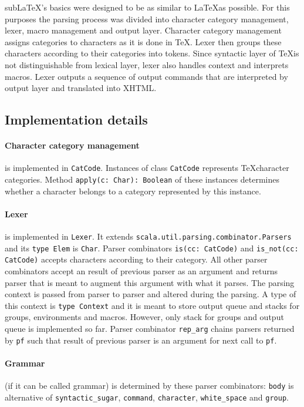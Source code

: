 \documentclass{article}
\begin{document}
sub\LaTeX's basics were designed to be as similar to \LaTeX as possible.
For this purposes the parsing process was divided into character category management,
lexer, macro management and output layer.
Character category management assigns categories to characters as it is done in \TeX.
Lexer then groups these characters according to their categories into tokens.
Since syntactic layer of \TeX is not distinguishable from lexical layer,
lexer also handles context and interprets macros. Lexer outputs a sequence of output commands
that are interpreted by output layer and translated into XHTML.


\subsection{Implementation details}

\paragraph{Character category management} is implemented in \verb+CatCode+.
Instances of class \verb+CatCode+ represents \TeX character categories.
Method \verb+apply(c: Char): Boolean+ of these instances determines
whether a character belongs to a category represented by this instance.

\paragraph{Lexer} is implemented in \verb+Lexer+. It extends \verb+scala.util.parsing.combinator.Parsers+
and its \verb+type Elem+ is \verb+Char+.
Parser combinators \verb+is(cc: CatCode)+ and%
\verb+is_not(cc: CatCode)+ accepts characters according to their category.
All other parser combinators accept an result of previous parser as an argument
and returns parser that is meant to augment this argument with what it parses.
The parsing context is passed from parser to parser and altered during the parsing.
A type of this context is \verb+type Context+ and it is meant to store output queue and stacks for groups,
environments and macros. However, only stack for groups and output queue is implemented so far.
Parser combinator \verb+rep_arg+ chains parsers returned by \verb+pf+
such that result of previous parser is an argument for next call to \verb+pf+.

\paragraph{Grammar} (if it can be called grammar) is determined by these parser combinators:
\verb+body+ is alternative of \verb+syntactic_sugar+, \verb+command+, \verb+character+,
\verb+white_space+ and \verb+group+.
\end{document}
